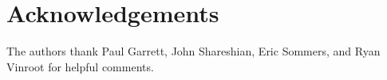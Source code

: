\documentclass[10pt]{amsart}
\theoremstyle{plain}
\theoremstyle{definition}
\theoremstyle{remark}
\numberwithin{equation}{section}
\newcommand\semidirect{\ltimes}
\newcommand\FF{\mathbb{F}}
\begin{document}

\section{Acknowledgements}
The authors thank Paul Garrett, John Shareshian, Eric Sommers, and
Ryan Vinroot for helpful comments.
\end{document}
